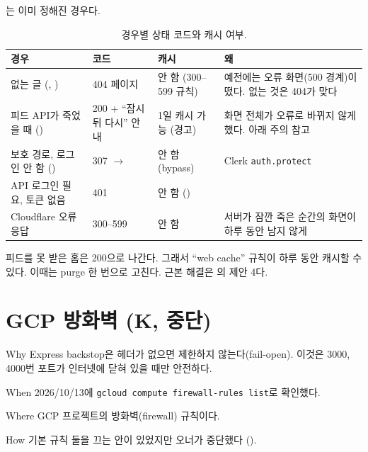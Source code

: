 는 이미 정해진 경우다.

\begin{table}[H]
  \caption{경우별 상태 코드와 캐시 여부.}\label{tab:05-status-codes}
  \small
  \begin{tabularx}{\linewidth}{L{4cm} L{2.8cm} L{2.4cm} Y}
    \toprule
    경우 & 코드 & 캐시 & 왜 \\
    \midrule
    없는 글 (, ) & 404 페이지 & 안 함 (300--599 규칙) & 예전에는 오류 화면(500 경계)이 떴다. 없는 것은 404가 맞다 \\
    \midrule
    피드 API가 죽었을 때 () & 200 + ``잠시 뒤 다시'' 안내 & 1일 캐시 가능 (경고) & 화면 전체가 오류로 바뀌지 않게 했다. 아래 주의 참고 \\
    \midrule
    보호 경로, 로그인 안 함 () & 307 $\rightarrow$  & 안 함 (bypass) & Clerk \texttt{auth.protect} \\
    \midrule
    API 로그인 필요, 토큰 없음 & 401 & 안 함 () &  \\
    \midrule
    Cloudflare 오류 응답 & 300--599 & 안 함 & 서버가 잠깐 죽은 순간의 화면이 하루 동안 남지 않게 \\
    \bottomrule
  \end{tabularx}
\end{table}

\begin{callout}[주의: 피드 안내 화면]
피드를 못 받은 홈은 200으로 나간다.
그래서 ``web cache'' 규칙이 하루 동안 캐시할 수 있다.
이때는 purge 한 번으로 고친다.
근본 해결은 의 제안 4다.
\end{callout}

\section{GCP 방화벽 (K, 중단)}\label{sec:05-firewall}

\begin{inbrief}
  \item[Why] Express backstop은 헤더가 없으면 제한하지 않는다(fail-open). 이것은 3000, 4000번 포트가 인터넷에 닫혀 있을 때만 안전하다.
  \item[When] 2026/10/13에 \texttt{gcloud compute firewall-rules list}로 확인했다.
  \item[Where] GCP 프로젝트의 방화벽(firewall) 규칙이다.
  \item[How] 기본 규칙 둘을 끄는 안이 있었지만 오너가 중단했다 ().
\end{inbrief}

